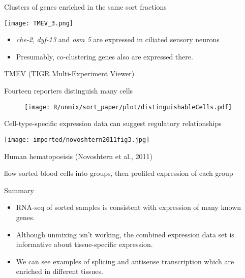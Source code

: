 \documentclass[serif,9pt]{beamer}
\begin{document}
\begin{frame}{Clusters of genes enriched in the same sort fractions}

\begin{minipage}{0.45\textwidth}
\texttt{[image: TMEV\_3.png]}
\end{minipage}
\begin{minipage}{0.48\textwidth}
\begin{itemize}

\item {\em che-2}, {\em dyf-13} and {\em osm 5} are expressed in ciliated
sensory neurons

\item Presumably, co-clustering genes also are expressed there.
\end{itemize}

\end{minipage}

\hfill TMEV (TIGR Multi-Experiment Viewer)
\end{frame}

\begin{frame}{Fourteen reporters distinguish many cells}

\begin{figure}
\begin{centering}
\texttt{[image: R/unmix/sort\_paper/plot/distinguishableCells.pdf]}

\end{centering}
\end{figure}

\end{frame}

\begin{frame}{Cell-type-specific expression data can suggest regulatory relationships}

\texttt{[image: imported/novoshtern2011fig3.jpg]}

Human hematopoeisis (Novoshtern et al., 2011)

{\small flow sorted blood cells into groups, then profiled expression of each group}

\end{frame}

\begin{frame}{Summary}

\begin{itemize}

\item RNA-seq of sorted samples is consistent with
expression of many known genes.

\item Although unmixing isn't working, the combined expression data
set is informative about tissue-specific expression.

\item We can see examples of splicing and antisense transcription
which are enriched in different tissues.

\end{itemize}

\end{frame}
\end{document}
